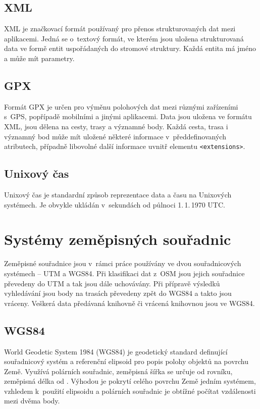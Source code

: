 \subsection{XML}
XML \cite{XML} je značkovací formát používaný pro přenos strukturovaných dat
mezi aplikacemi. Jedná se o~textový formát, ve kterém jsou uložena strukturovaná
data ve formě entit uspořádaných do stromové struktury. Každá entita má jméno a
může mít parametry. 

\subsection{GPX}
Formát GPX\cite{GPX} je určen pro výměnu polohových dat mezi různými zařízeními s~GPS,
popřípadě mobilními a jinými aplikacemi. Data jsou uložena ve formátu XML, jsou
dělena na cesty, trasy a významné body. Každá cesta, trasa i významný bod může
mít uložené některé informace v~předdefinovaných atributech, případně libovolné
další informace uvnitř elementu {\tt <extensions>}. 

\subsection{Unixový čas}
Unixový čas je standardní způsob reprezentace data a času na Unixových
systémech. Je obvykle ukládán v~sekundách od půlnoci 1.\,1.\,1970 UTC.

\section{Systémy zeměpisných souřadnic}
Zeměpisné souřadnice jsou v~rámci práce používány ve dvou souřadnicových
systémech -- UTM a WGS84. Při klasifikaci dat z~OSM jsou jejich souřadnice
převedeny do UTM a tak jsou dále uchovávány. Při přípravě výsledků vyhledávání
jsou body na trasách převedeny zpět do WGS84 a takto jsou vráceny. Veškerá data
předávaná knihovně či vrácená knihovnou jsou ve WGS84.
\subsection{WGS84}
World Geodetic System 1984 (WGS84)\cite{WGS84} je geodetický standard
definující souřadnicový systém a referenční elipsoid pro popis polohy objektů na
povrchu Země. Využívá polárních souřadnic, zeměpisná šířka se určuje od rovníku,
zeměpisná délka od . Výhodou je pokrytí celého
povrchu Země jedním systémem, vzhledem k~použití elipsoidu a polárních souřadnic
je obtížné počítat vzdálenosti mezi dvěma body.
